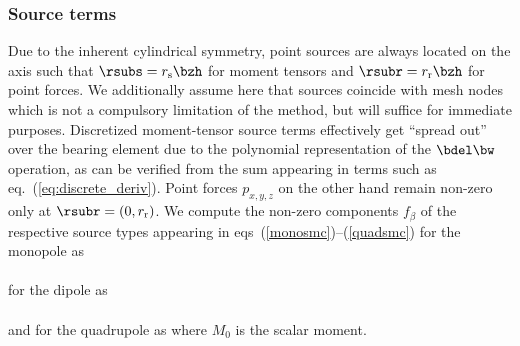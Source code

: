 \subsubsection{Source terms}\label{section:source}
%
Due to the inherent cylindrical symmetry, point sources are always located
on the axis such that $\rsubs=r_{\rm s} \bzh$ for moment tensors and
$\rsubr=r_{\rm r} \bzh$ for point forces.
We additionally assume here that sources coincide with mesh nodes which
is not a compulsory limitation of the method, but will suffice for immediate
purposes. Discretized moment-tensor source terms effectively get
``spread out'' over the bearing element due to the polynomial representation of
the $\bdel \bw$ operation, as can be verified from the sum appearing in terms
such as eq.~(\ref{eq:discrete_deriv}).
Point forces $p_{x,y,z}$ on the other hand remain non-zero only at
$\rsubr=(0,r_{\rm r})$.
%
We compute the non-zero components $f_\beta$ of the respective source types
appearing in eqs~(\ref{monosmc})--(\ref{quadsmc}) for the monopole as
%
\eqa \label{eq:src_mo}
 \vspace*{0.2cm}\\
\vspace*{0.2cm}\\
\ena
%
for the dipole as
%
\eqa \label{eq:src_di}
 \vspace*{0.2cm}\\
\vspace*{0.2cm}\\
\ena
%
and for the quadrupole as
%
\eqa \label{eq:src_qu}
\ena
%
where $M_0$ is the scalar moment.
